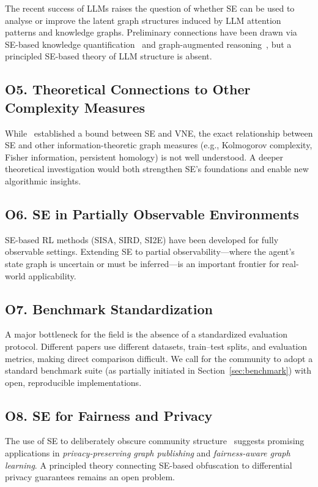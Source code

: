 The recent success of LLMs raises the question of whether SE can be used to
analyse or improve the latent graph structures induced by LLM attention
patterns and knowledge graphs.
Preliminary connections have been drawn via SE-based knowledge
quantification~\cite{wang2023quantifyingKnowledge} and graph-augmented
reasoning~\cite{li2023graphMeetsLLM}, but a principled SE-based theory of LLM
structure is absent.

\subsection*{O5. Theoretical Connections to Other Complexity Measures}

While~\cite{liu2022similaritygap} established a bound between SE and VNE, the
exact relationship between SE and other information-theoretic graph measures
(e.g., Kolmogorov complexity, Fisher information, persistent homology) is not
well understood.
A deeper theoretical investigation would both strengthen SE's foundations and
enable new algorithmic insights.

\subsection*{O6. SE in Partially Observable Environments}

SE-based RL methods (SISA, SIRD, SI2E) have been developed for fully
observable settings.
Extending SE to partial observability---where the agent's state graph is
uncertain or must be inferred---is an important frontier for real-world
applicability.

\subsection*{O7. Benchmark Standardization}

A major bottleneck for the field is the absence of a standardized evaluation
protocol.
Different papers use different datasets, train--test splits, and evaluation
metrics, making direct comparison difficult.
We call for the community to adopt a standard benchmark suite (as partially
initiated in Section~\ref{sec:benchmark}) with open, reproducible
implementations.

\subsection*{O8. SE for Fairness and Privacy}

The use of SE to deliberately obscure community structure~\cite{liu2019rem}
suggests promising applications in \emph{privacy-preserving graph publishing}
and \emph{fairness-aware graph learning}.
A principled theory connecting SE-based obfuscation to differential privacy
guarantees remains an open problem.

